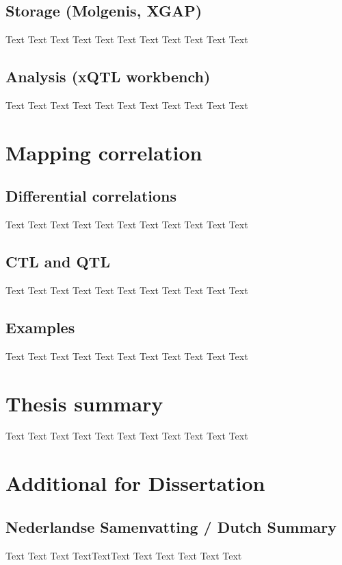 \documentclass[10pt, oneside, a5paper]{report}
\begin{document}
\section{Storage (Molgenis, XGAP)}
Text Text Text Text Text Text Text Text Text Text Text

\section{Analysis (xQTL workbench)}
Text Text Text Text Text Text Text Text Text Text Text

\chapter{Mapping correlation}
\section{Differential correlations}
Text Text Text Text Text Text Text Text Text Text Text

\section{CTL and QTL}
Text Text Text Text Text Text Text Text Text Text Text

\section{Examples}
Text Text Text Text Text Text Text Text Text Text Text

\chapter{Thesis summary}
Text Text Text Text Text Text Text Text Text Text Text

\chapter{Additional for Dissertation}
\section*{Nederlandse Samenvatting / Dutch Summary}
Text Text Text TextTextText Text Text Text Text Text
\end{document}
